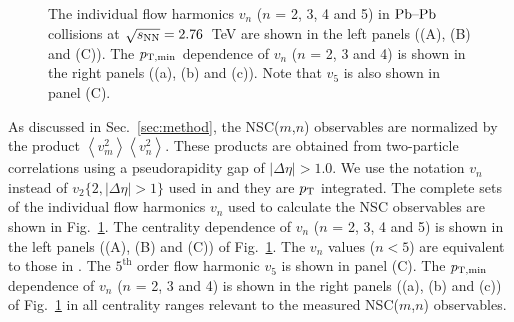 \begin{figure}
	\begin{center}
        \caption{The individual flow harmonics $v_n$ ($n$ = 2, 3, 4 and 5) in $\textnormal{Pb--Pb}$ collisions at $\sqrt{s_{\textnormal{NN}}}=2.76$~TeV are shown in the left panels ((A), (B) and (C)). The $p_{\rm T, min}$ dependence of $v_n$ ($n$ = 2, 3 and 4) is shown in the right panels ((a), (b) and (c)). Note that $v_5$ is also shown in panel (C).}
        \label{fig:Figure_2A}
        \end{center}   
\end{figure}

As discussed in Sec.~\ref{sec:method}, the NSC($m$,$n$) observables are normalized by the product $\left<v_{m}^2\right>\left<v_{n}^2\right>$.
These products are obtained from two-particle correlations using a pseudorapidity gap of $|\Delta\eta| > 1.0$. We use the notation $v_n$ instead of $v_{2}\{2, |\Delta\eta|>1\}$ used in \cite{Adam:2016izf} and they are $p_{\rm T}$ integrated.
The complete sets of the individual flow harmonics $v_n$ used to calculate the NSC observables are shown in Fig.~\ref{fig:Figure_2A}.
The centrality dependence of $v_n$ ($n$ = 2, 3, 4 and 5) is shown in the left panels ((A), (B) and (C)) of  Fig.~\ref{fig:Figure_2A}. The $v_n$ values ($n < 5$) are equivalent to those in \cite{Adam:2016izf}. The $5^{\mathrm{th}}$ order flow harmonic $v_5$ is shown in panel (C). The $p_{\rm T, min}$ dependence of $v_n$ ($n$ = 2, 3 and 4) is shown in the right panels ((a), (b) and (c)) of Fig.~\ref{fig:Figure_2A} in all centrality ranges relevant to the measured NSC($m$,$n$) observables.

